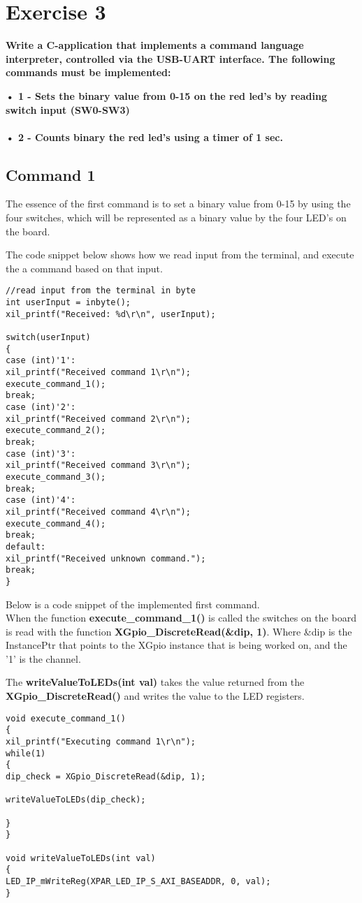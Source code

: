 
\chapter{Exercise 3}


\textbf{Write a C-application that implements a command language interpreter, controlled via the
	USB-UART interface. The following commands must be implemented:}
	
\textbf{• 1 - Sets the binary value from 0-15 on the red led’s by reading switch input (SW0-SW3)\\\\	
• 2 - Counts binary the red led’s using a timer of 1 sec.}

\section{Command 1}
The essence of the first command is to set a binary value from 0-15 by using the four switches, which will be represented as a binary value by the four LED's on the board. 

The code snippet below shows how we read input from the terminal, and execute the a command based on that input.
\begin{lstlisting}
//read input from the terminal in byte
int userInput = inbyte();
xil_printf("Received: %d\r\n", userInput);

switch(userInput)
{
case (int)'1':
xil_printf("Received command 1\r\n");
execute_command_1();
break;
case (int)'2':
xil_printf("Received command 2\r\n");
execute_command_2();
break;
case (int)'3':
xil_printf("Received command 3\r\n");
execute_command_3();
break;
case (int)'4':
xil_printf("Received command 4\r\n");
execute_command_4();
break;
default:
xil_printf("Received unknown command.");
break;
}
\end{lstlisting}
Below is a code snippet of the implemented first command. \\
When the function \textbf{execute\_command\_1()} is called the switches on the board is read with the function \textbf{XGpio\_DiscreteRead(\&dip, 1)}. Where \&dip is the InstancePtr that points to the XGpio instance that is being worked on, and the '1' is the channel. 

The \textbf{writeValueToLEDs(int val)} takes the value returned from the \textbf{XGpio\_DiscreteRead()} and writes the value to the LED registers. 
\begin{lstlisting}
void execute_command_1()
{
xil_printf("Executing command 1\r\n");
while(1)
{
dip_check = XGpio_DiscreteRead(&dip, 1);

writeValueToLEDs(dip_check);

}
}

void writeValueToLEDs(int val)
{
LED_IP_mWriteReg(XPAR_LED_IP_S_AXI_BASEADDR, 0, val);
}
\end{lstlisting}

